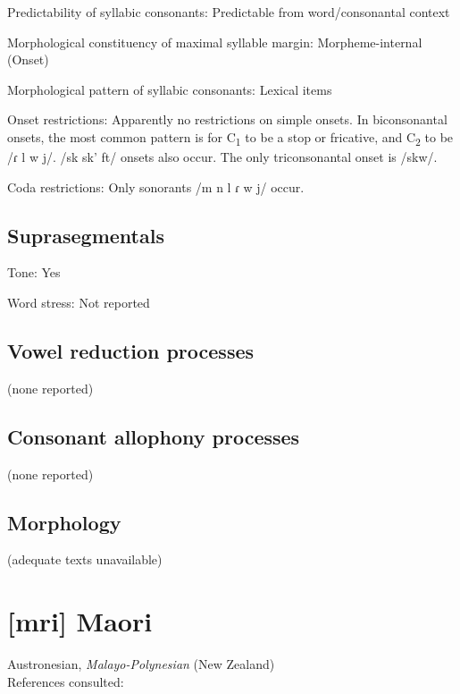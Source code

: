 {\begin{appendixdesc}
\item[Predictability of syllabic consonants:] Predictable from word/consonantal context

\item[Morphological constituency of maximal syllable margin:] Morpheme-internal (Onset)

\item[Morphological pattern of syllabic consonants:] Lexical items

\item[Onset restrictions:] Apparently no restrictions on simple onsets. In biconsonantal onsets, the most common pattern is for C\textsubscript{1} to be a stop or fricative, and C\textsubscript{2} to be /ɾ l w j/. /sk sk’ ft/ onsets also occur. The only triconsonantal onset is /skw/.

\item[Coda restrictions:] Only sonorants /m n l ɾ w j/ occur.
\end{appendixdesc}
\subsection*{Suprasegmentals}
\begin{appendixdesc}
\item[Tone:] Yes

\item[Word stress:] Not reported
\end{appendixdesc}
\subsection*{Vowel reduction processes}
(none reported)
\subsection*{Consonant allophony processes}

(none reported)

\subsection*{Morphology}

(adequate texts unavailable)

\section*{[mri] Maori}   %
Austronesian, \textit{Malayo-Polynesian} (New Zealand)\medskip\\
References consulted: \citet{Bauer1999}
}
